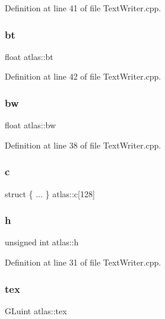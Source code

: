 Definition at line 41 of file Text\+Writer.\+cpp.

\mbox{\label{structatlas_a9d0c808989b3428420da705a40905068}} 
\subsubsection{\texorpdfstring{bt}{bt}}
{\footnotesize\ttfamily float atlas\+::bt}



Definition at line 42 of file Text\+Writer.\+cpp.

\mbox{\label{structatlas_a304954b04272b5ff2758ae8504dc5858}} 
\subsubsection{\texorpdfstring{bw}{bw}}
{\footnotesize\ttfamily float atlas\+::bw}



Definition at line 38 of file Text\+Writer.\+cpp.

\mbox{\label{structatlas_a010cf923db6de0a7a4923d7f6dd2175e}} 
\subsubsection{\texorpdfstring{c}{c}}
{\footnotesize\ttfamily struct \{ ... \}   atlas\+::c\mbox{[}128\mbox{]}}

\mbox{\label{structatlas_ad780d19f50dcc0435b7fd9493326599d}} 
\subsubsection{\texorpdfstring{h}{h}}
{\footnotesize\ttfamily unsigned int atlas\+::h}



Definition at line 31 of file Text\+Writer.\+cpp.

\mbox{\label{structatlas_a404771e1eaa3c2566b9edc706e11348d}} 
\subsubsection{\texorpdfstring{tex}{tex}}
{\footnotesize\ttfamily G\+Luint atlas\+::tex}



